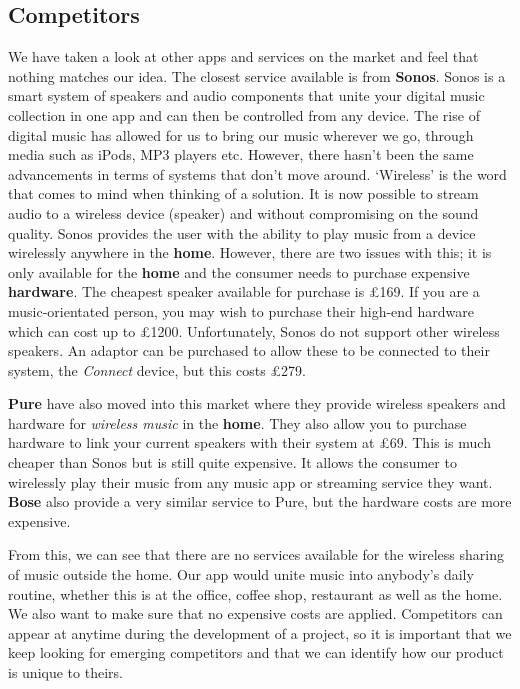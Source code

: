 \subsection{\textbf{Competitors}}
We have taken a look at other apps and services on the market and feel that nothing matches our idea. The closest service available is from \textbf{Sonos}. Sonos is a smart system of speakers and audio components that unite your digital music collection in one app and can then be controlled from any device. The rise of digital music has allowed for us to bring our music wherever we go, through media such as iPods, MP3 players etc. However, there hasn't been the same advancements in terms of systems that don't move around. `Wireless' is the word that comes to mind when thinking of a solution. It is now possible to stream audio to a wireless device (speaker) and without compromising on the sound quality. Sonos provides the user with the ability to play music from a device wirelessly anywhere in the \textbf{home}. However, there are two issues with this; it is only available for the \textbf{home} and the consumer needs to purchase expensive \textbf{hardware}. The cheapest speaker available for purchase is \pounds169. If you are a music-orientated person, you may wish to purchase their high-end hardware which can cost up to \pounds1200. Unfortunately, Sonos do not support other wireless speakers. An adaptor can be purchased to allow these to be connected to their system, the \emph{Connect} device, but this costs \pounds279.  

\textbf{Pure} have also moved into this market where they provide wireless speakers and hardware for \emph{wireless music} in the \textbf{home}. They also allow you to purchase hardware to link your current speakers with their system at \pounds69.  This is much cheaper than Sonos but is still quite expensive. It allows the consumer to wirelessly play their music from any music app or streaming service they want. \textbf{Bose} also provide a very similar service to Pure, but the hardware costs are more expensive.

From this, we can see that there are no services available for the wireless sharing of music outside the home. Our app would unite music into anybody's daily routine, whether this is at the office, coffee shop, restaurant as well as the home. We also want to make sure that no expensive costs are applied.
Competitors can appear at anytime during the development of a project, so it is important that we keep looking for emerging competitors and that we can identify how our product is unique to theirs. 

